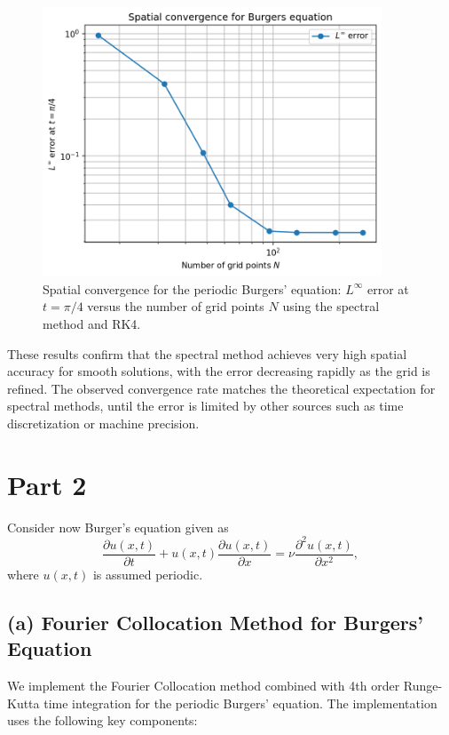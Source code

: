 \documentclass{article}
\begin{document}
\begin{figure}[htbp]
    \centering
    \includegraphics[width=0.9\textwidth]{figure/burgers_N_convergence.png}
    \caption{Spatial convergence for the periodic Burgers' equation: $L^\infty$ error at $t = \pi/4$ versus the number of grid points $N$ using the spectral method and RK4.}
    \label{fig:burgers_N_convergence}
\end{figure}

These results confirm that the spectral method achieves very high spatial accuracy for smooth solutions, with the error decreasing rapidly as the grid is refined. The observed convergence rate matches the theoretical expectation for spectral methods, until the error is limited by other sources such as time discretization or machine precision.

\section*{Part 2}
Consider now Burger's equation given as
\begin{equation}
    \frac{\partial u(x, t)}{\partial t} + u(x, t) \frac{\partial u(x, t)}{\partial x} = \nu \frac{\partial^2 u(x, t)}{\partial x^2},
\end{equation}
where $u(x, t)$ is assumed periodic. 

\subsection*{(a) Fourier Collocation Method for Burgers' Equation}
We implement the Fourier Collocation method combined with 4th order Runge-Kutta time integration for the periodic Burgers' equation. The implementation uses the following key components:
\end{document}

